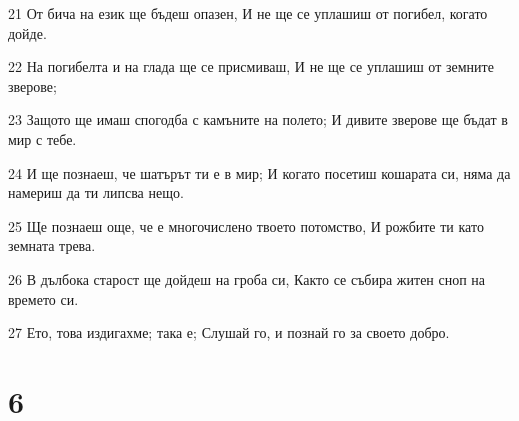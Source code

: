 \par 21 От бича на език ще бъдеш опазен, И не ще се уплашиш от погибел, когато дойде.
\par 22 На погибелта и на глада ще се присмиваш, И не ще се уплашиш от земните зверове;
\par 23 Защото ще имаш спогодба с камъните на полето; И дивите зверове ще бъдат в мир с тебе.
\par 24 И ще познаеш, че шатърът ти е в мир; И когато посетиш кошарата си, няма да намериш да ти липсва нещо.
\par 25 Ще познаеш още, че е многочислено твоето потомство, И рожбите ти като земната трева.
\par 26 В дълбока старост ще дойдеш на гроба си, Както се събира житен сноп на времето си.
\par 27 Ето, това издигахме; така е; Слушай го, и познай го за своето добро.

\chapter{6}

